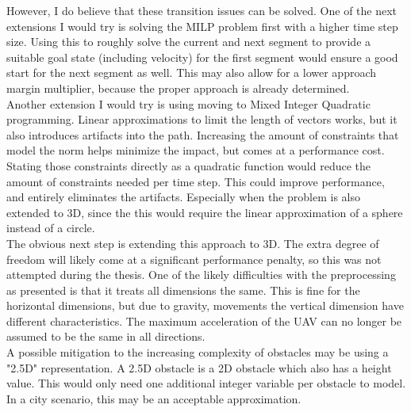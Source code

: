 However, I do believe that these transition issues can be solved. One of the next extensions I would try is solving the MILP problem first with a higher time step size. Using this to roughly solve the current and next segment to provide a suitable goal state (including velocity) for the first segment would ensure a good start for the next segment as well. This may also allow for a lower approach margin multiplier, because the proper approach is already determined. \\

Another extension I would try is using moving to Mixed Integer Quadratic programming. Linear approximations to limit the length of vectors works, but it also introduces artifacts into the path. Increasing the amount of constraints that model the norm helps minimize the impact, but comes at a performance cost. Stating those constraints directly as a quadratic function would reduce the amount of constraints needed per time step. This could improve performance, and entirely eliminates the artifacts. Especially when the problem is also extended to 3D, since the this would require the linear approximation of a sphere instead of a circle. \\

The obvious next step is extending this approach to 3D. The extra degree of freedom will likely come at a significant performance penalty, so this was not attempted during the thesis. One of the likely difficulties with the preprocessing as presented is that it treats all dimensions the same. This is fine for the horizontal dimensions, but due to gravity, movements the vertical dimension have different characteristics. The maximum acceleration of the UAV can no longer be assumed to be the same in all directions.\\
A possible mitigation to the increasing complexity of obstacles may be using a "2.5D" representation. A 2.5D obstacle is a 2D obstacle which also has a height value. This would only need one additional integer variable per obstacle to model. In a city scenario, this may be an acceptable approximation. \\

